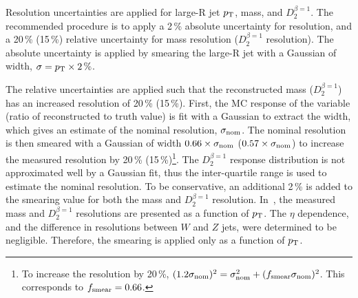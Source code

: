 Resolution uncertainties are applied for large-R jet $p_{\text{T}}$, mass, and $D_2^{\beta=1}$. The recommended procedure is to apply a 2\,\% absolute uncertainty for \pT resolution, and a 20\,\% (15\,\%) relative uncertainty for mass resolution ($D_2^{\beta=1}$ resolution). The absolute uncertainty is applied by smearing the large-R jet \pT with a Gaussian of width, $\sigma=p_{\text{T}}\times2\,\%$. 

The relative uncertainties are applied such that the reconstructed mass ($D_2^{\beta=1}$) has an increased resolution of 20\,\% (15\,\%). First, the MC response of the variable (ratio of reconstructed to truth value) is fit with a Gaussian to extract the width, which gives an estimate of the nominal resolution, $\sigma_{\rm nom}$. The nominal resolution is then smeared with a Gaussian of width $0.66\times\sigma_{\rm nom}$ ($0.57\times\sigma_{\rm nom}$) to increase the measured resolution by 20\,\% (15\,\%)\footnote{
	To increase the resolution by 20\,\%, $(1.2\sigma_{\rm nom})^2 = \sigma_{\rm nom}^2 + (f_{\rm smear}\sigma_{\rm nom})^2$. This corresponds to $f_{\rm smear}=0.66$.
}. The $D_2^{\beta=1}$ response distribution is not approximated well by a Gaussian fit, thus the inter-quartile range is used to estimate the nominal resolution. To be conservative, an additional 2\,\% is added to the smearing value for both the mass and $D_2^{\beta=1}$ resolution. In~\Fig{\ref{fig:larger_res}}, the measured mass and $D_2^{\beta=1}$ resolutions are presented as a function of $p_{\text{T}}$. The $\eta$ dependence, and the difference in resolutions between $W$ and $Z$ jets, were determined to be negligible. Therefore, the smearing is applied only as a function of $p_{\text{T}}$.

